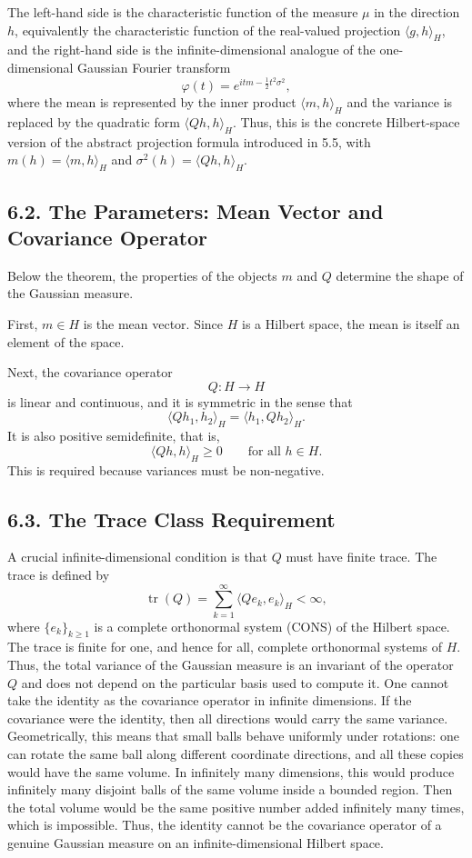 \documentclass[11pt]{article}
\theoremstyle{definition}
\theoremstyle{remark}
\begin{document}
The left-hand side is the characteristic function of the measure \(\mu\) in the direction \(h\), equivalently the characteristic function of the real-valued projection \(\langle g,h\rangle_H\), and the right-hand side is the infinite-dimensional analogue of the one-dimensional Gaussian Fourier transform
\[
\varphi(t)=e^{itm-\frac12 t^2\sigma^2},
\]
where the mean is represented by the inner product $\langle m,h\rangle_H$ and the variance is replaced by the quadratic form $\langle Qh,h\rangle_H$.
Thus, this is the concrete Hilbert-space version of the abstract projection formula introduced in 5.5, with $m(h)=\langle m,h\rangle_H$ and $\sigma^2(h)=\langle Qh,h\rangle_H$.

\subsection*{6.2. The Parameters: Mean Vector and Covariance Operator}
Below the theorem, the properties of the objects $m$ and $Q$ determine the shape of the Gaussian measure.

First, $m\in H$ is the mean vector. Since $H$ is a Hilbert space, the mean is itself an element of the space.

Next, the covariance operator
\[
Q:H\to H
\]
is linear and continuous, and it is symmetric in the sense that
\[
\langle Qh_1,h_2\rangle_H=\langle h_1,Qh_2\rangle_H.
\]
It is also positive semidefinite, that is,
\[
\langle Qh,h\rangle_H\ge 0
\qquad \text{for all } h\in H.
\]
This is required because variances must be non-negative.

\subsection*{6.3. The Trace Class Requirement}
A crucial infinite-dimensional condition is that $Q$ must have finite trace. The trace is defined by
\[
\operatorname{tr}(Q)=\sum_{k=1}^{\infty}\langle Qe_k,e_k\rangle_H<\infty,
\]
where $\{e_k\}_{k\ge 1}$ is a complete orthonormal system (CONS) of the Hilbert space. The trace is finite for one, and hence for all, complete orthonormal systems of $H$. Thus, the total variance of the Gaussian measure is an invariant of the operator $Q$ and does not depend on the particular basis used to compute it.
One cannot take the identity as the covariance operator in infinite dimensions. If the covariance were the identity, then all directions would carry the same variance. Geometrically, this means that small balls behave uniformly under rotations: one can rotate the same ball along different coordinate directions, and all these copies would have the same volume. In infinitely many dimensions, this would produce infinitely many disjoint balls of the same volume inside a bounded region. Then the total volume would be the same positive number added infinitely many times, which is impossible. Thus, the identity cannot be the covariance operator of a genuine Gaussian measure on an infinite-dimensional Hilbert space.
\end{document}
